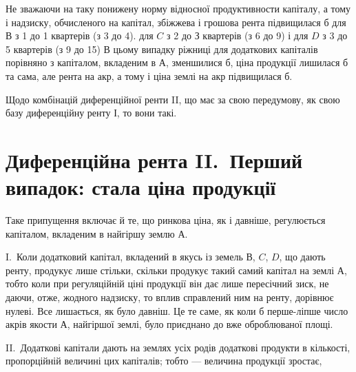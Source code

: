 Не зважаючи на таку понижену норму відносної продуктивности капіталу,
а тому і надзиску, обчисленого на капітал, збіжжева і грошова рента підвищилася
б для $В$ з 1 до 1 квартерів (з 3 до 4). для $C$ з 2 до
З квартерів (з 6 до 9) і для $D$ з 3 до 5 квартерів (з 9 до 15)
В цьому випадку ріжниці для додаткових капіталів порівняно з капіталом,
вкладеним в $А$, зменшилися б, ціна продукції лишилася б та сама, але рента
на акр, а тому і ціна землі на акр підвищилася б.

Щодо комбінацій диференційної ренти II, що має за свою передумову, як
свою базу диференційну ренту І, то вони такі.

\section{Диференційна рента II.~Перший випадок: стала ціна продукції}

Таке припущення включає й те, що ринкова ціна, як і давніше, регулюється
капіталом, вкладеним в найгіршу землю $А$.

I.~Коли додатковий капітал, вкладений в якусь із земель $В$, $C$, $D$, що
дають ренту, продукує лише стільки, скільки продукує такий самий капітал на
землі $А$, тобто коли при регуляційній ціні продукції він дає лише пересічний
зиск, не даючи, отже, жодного надзиску, то вплив справлений ним на ренту, дорівнює
нулеві. Все лишається, як було давніш. Це те саме, як коли б перше-ліпше
число акрів якости $А$, найгіршої землі, було приєднано до вже оброблюваної
площі.

II.~Додаткові капітали дають на землях усіх родів додаткові продукти в кількості,
пропорційній величині цих капіталів; тобто — величина продукції зростає,
\parbreak{}  %
